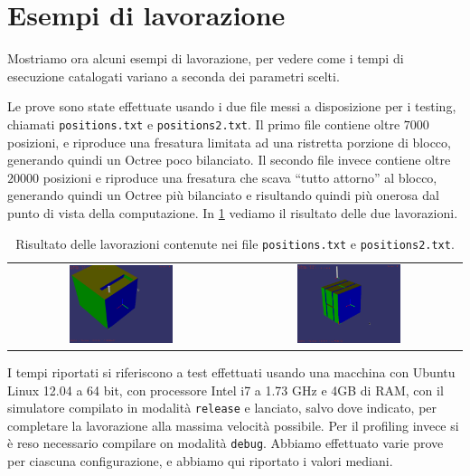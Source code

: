 \section{Esempi di lavorazione}
Mostriamo ora alcuni esempi di lavorazione, per vedere come i tempi di esecuzione catalogati variano a seconda dei parametri scelti.

Le prove sono state effettuate usando i due file messi a disposizione per i testing, chiamati \texttt{positions.txt} e \texttt{positions2.txt}. Il primo file contiene oltre $7000$ posizioni, e riproduce una fresatura limitata ad una ristretta porzione di blocco, generando quindi un Octree poco bilanciato. Il secondo file invece contiene oltre $20000$ posizioni e riproduce una fresatura che scava ``tutto attorno'' al blocco, generando quindi un Octree più bilanciato e risultando quindi più onerosa dal punto di vista della computazione. In \ref{tab:lavfinali} vediamo il risultato delle due lavorazioni.
\begin{center}
\begin{table}[h]
  \begin{tabular}{cc}
   \includegraphics[width=0.48\textwidth]{img/screenshots/pos_box_v05_1.png} &%
   \includegraphics[width=0.48\textwidth]{img/screenshots/pos2_box_v1_2.png}\\
  \end{tabular}
  \caption{Risultato delle lavorazioni contenute nei file \texttt{positions.txt} e \texttt{positions2.txt}.}
  \label{tab:lavfinali}
\end{table}
\end{center}
I tempi riportati si riferiscono a test effettuati usando una macchina con Ubuntu Linux 12.04 a 64 bit, con processore Intel i7 a 1.73 GHz e 4GB di RAM, con il simulatore compilato in modalità \verb!release! e lanciato, salvo dove indicato, per completare la lavorazione alla massima velocità possibile. Per il profiling invece si è reso necessario compilare on modalità \verb!debug!. Abbiamo effettuato varie prove per ciascuna configurazione, e abbiamo qui riportato i valori mediani.

